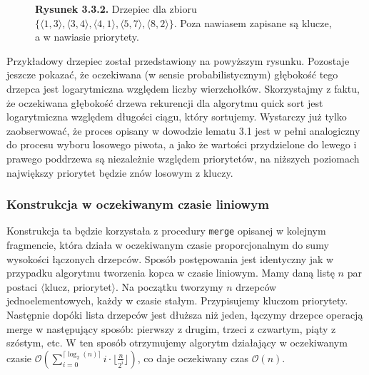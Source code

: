 \documentclass[declaration,shortabstract]{iithesis}
\theoremstyle{definition} \newtheorem{definition}{Definicja}[chapter]
\theoremstyle{remark} \newtheorem{remark}[definition]{Obserwacja}
\theoremstyle{plain} \newtheorem{theorem}[definition]{Twierdzenie}
\theoremstyle{remark} \newtheorem{example}{Przykład}[definition]
\theoremstyle{plain} \newtheorem{lemma}[definition]{Lemat}
\begin{document}
\begin{figure}[h]
    \begin{center}
        \caption*{\textbf{Rysunek 3.3.2.} Drzepiec dla zbioru $\{ \langle 1, 3 \rangle, \langle 3, 4 \rangle, \langle 4, 1 \rangle, \langle 5, 7 \rangle, \langle 8, 2 \rangle \}$. Poza nawiasem zapisane są klucze, a w nawiasie priorytety.}
    \end{center}
\end{figure}

Przykładowy drzepiec został przedstawiony na powyższym rysunku. Pozostaje jeszcze pokazać, że oczekiwana (w sensie probabilistycznym) głębokość tego drzepca jest logarytmiczna względem liczby wierzchołków. Skorzystajmy z faktu, że oczekiwana głębokość drzewa rekurencji dla algorytmu quick sort jest logarytmiczna względem długości ciągu, który sortujemy. Wystarczy już tylko zaobserwować, że proces opisany w dowodzie lematu 3.1 jest w pełni analogiczny do procesu wyboru losowego piwota, a jako że wartości przydzielone do lewego i prawego poddrzewa są niezależnie względem priorytetów, na niższych poziomach największy priorytet będzie znów losowym z kluczy.

\subsubsection{Konstrukcja w oczekiwanym czasie liniowym}

Konstrukcja ta będzie korzystała z procedury \texttt{merge} opisanej w kolejnym fragmencie, która działa w oczekiwanym czasie proporcjonalnym do sumy wysokości łączonych drzepców. Sposób postępowania jest identyczny jak w przypadku algorytmu tworzenia kopca w czasie liniowym. Mamy daną listę $n$ par postaci $\langle$klucz, priorytet$\rangle$. Na początku tworzymy $n$ drzepców jednoelementowych, każdy w czasie stałym. Przypisujemy kluczom priorytety. Następnie dopóki lista drzepców jest dłuższa niż jeden, łączymy drzepce operacją merge w następujący sposób: pierwszy z drugim, trzeci z czwartym, piąty z szóstym, etc. W ten sposób otrzymujemy algorytm działający w oczekiwanym czasie $\mathcal{O}( \sum_{i=0}^{\lceil \log_{2}(n) \rceil} i \cdot \lfloor \frac{n}{2^i} \rfloor)$, co daje oczekiwany czas $\mathcal{O}(n)$.
\end{document}
